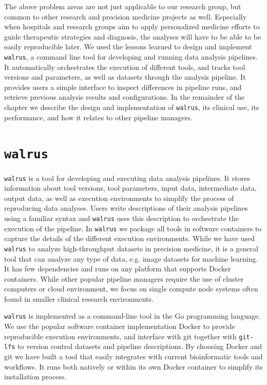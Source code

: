 The above problem areas are not just applicable to our research group, but
common to other research and precision medicine projects as well. Especially
when hospitals and research groups aim to apply personalized medicine efforts to
guide therapeutic strategies and diagnosis, the analyses will have to be able to
be easily reproducible later. We used the lessons learned to  design and
implement \texttt{walrus}, a command line tool for developing and running data
analysis pipelines. It automatically orchestrates the execution of different
tools, and tracks tool versions and parameters, as well as datasets through the
analysis pipeline. It provides users a simple interface to inspect differences
in pipeline runs, and retrieve previous analysis results and configurations. In
the remainder of the chapter we describe the design and implementation of
\texttt{walrus}, its clinical use, its performance, and how it relates to other
pipeline managers. 

\section{\texttt{walrus}} 
\texttt{walrus} is a tool for developing and executing data analysis pipelines.
It stores information about tool versions, tool parameters, input data,
intermediate data, output data, as well as execution environments to simplify
the process of reproducing data analyses. Users write descriptions of their
analysis pipelines using a familiar syntax and \texttt{walrus}  uses this
description to orchestrate the execution of the pipeline. In \texttt{walrus}  we
package all tools in software containers to capture the details of the different
execution environments. While we have used \texttt{walrus} to analyze
high-throughput datasets in precision medicine, it is a general tool that can
analyze any type of data, e.g. image datasets for machine learning. It has few
dependencies and runs on any platform that supports Docker containers. While
other popular pipeline managers require the use of cluster computers or cloud
environment, we focus on single compute node systems often found in smaller
clinical research environments. 

\texttt{walrus} is implemented as a command-line tool in the Go programming
language. We use the popular software container implementation
Docker\cite{docker} to provide reproducible execution environments, and
interface with git together with \texttt{git-lfs}\cite{gitlfs} to version control
datasets and pipeline descriptions. By choosing Docker and git we have built a
tool that easily integrates with current bioinformatic tools and workflows. It
runs both natively or within its own Docker container to simplify its
installation process.

